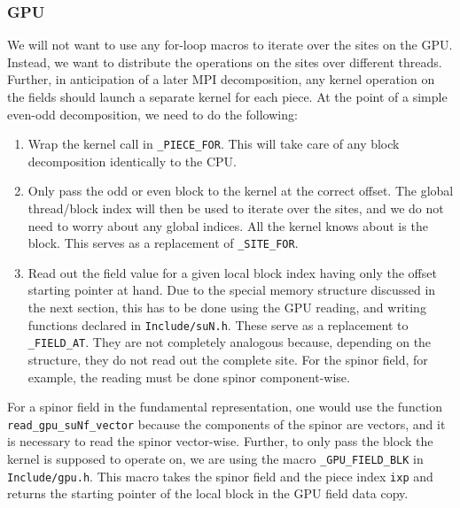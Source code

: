 \documentclass[12pt]{article}
\begin{document}
\subsubsection*{GPU}
We will not want to use any for-loop macros to iterate over the sites on the GPU. Instead, we want to distribute the operations on the sites over different threads. Further, in anticipation of a later MPI decomposition, any kernel operation on the fields should launch a separate kernel for each piece. At the point of a simple even-odd decomposition, we need to do the following:
\begin{enumerate}
    \item Wrap the kernel call in \texttt{\_PIECE\_FOR}. This will take care of any block decomposition identically to the CPU.
    \item Only pass the odd or even block to the kernel at the correct offset. The global thread/block index will then be used to iterate over the sites, and we do not need to worry about any global indices. All the kernel knows about is the block. This serves as a replacement of \texttt{\_SITE\_FOR}.
    \item Read out the field value for a given local block index having only the offset starting pointer at hand. Due to the special memory structure discussed in the next section, this has to be done using the GPU reading, and writing functions declared in \texttt{Include/suN.h}. These serve as a replacement to \texttt{\_FIELD\_AT}. They are not completely analogous because, depending on the structure, they do not read out the complete site. For the spinor field, for example, the reading must be done spinor component-wise.
\end{enumerate}

For a spinor field in the fundamental representation, one would use the function\\ \texttt{read\_gpu\_suNf\_vector} because the components of the spinor are vectors, and it is necessary to read the spinor vector-wise. Further, to only pass the block the kernel is supposed to operate on, we are using the macro \texttt{\_GPU\_FIELD\_BLK} in \texttt{Include/gpu.h}. This macro takes the spinor field and the piece index \texttt{ixp} and returns the starting pointer of the local block in the GPU field data copy.
\end{document}
